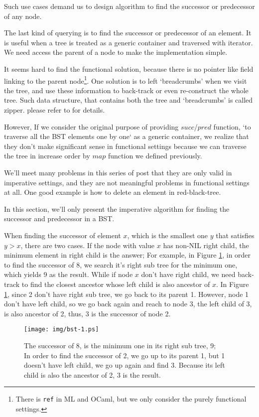 \documentclass[b5paper]{article}
\begin{document}
Such use cases demand us to design algorithm to find the successor or predecessor of any node.

The last kind of querying is to find the successor or predecessor of an element.
It is useful when a tree is treated as a generic container and traversed with
iterator. We need access the parent of a node to make the implementation
simple.

It seems hard to find the functional solution, because there
is no pointer like field linking to the parent node\footnote{There is \texttt{ref} in ML and OCaml, but we only consider the purely functional settings.}. One solution is
to left `breadcrumbs' when we visit the tree, and use these information
to back-track or even re-construct the whole tree. Such data structure,
that contains both the tree and `breadcrumbs' is called zipper.
please refer to \cite{zipper-hbook} for details.

However, If we consider
the original purpose of providing $succ$/$pred$ function, `to traverse all the
BST elements one by one` as a generic container, we realize
that they don't make significant sense in functional settings because
we can traverse the tree in increase order by $map$ function we defined
previously.

We'll meet many problems in this series of post that they are only valid
in imperative settings, and they are not meaningful problems in functional
settings at all. One good example is how to delete an element in
red-black-tree\cite{okasaki-blog}.

In this section, we'll only present the imperative algorithm for finding
the successor and predecessor in a BST.

When finding the successor of element $x$, which is the smallest one $y$
that satisfies $y > x$, there are two cases. If the node with value $x$
has non-NIL right child, the minimum element in right child is the answer;
For example, in Figure \ref{fig:bst-succ}, in order to find the successor
of 8, we search it's right sub tree for the minimum one, which yields 9
as the result. While if node $x$ don't have right child, we need
back-track to find the closest ancestor whose left child is also ancestor
of $x$. In Figure \ref{fig:bst-succ}, since 2 don't have right sub tree,
we go back to its parent 1. However, node 1 don't have left child, so we
go back again and reach to node 3, the left child of 3, is also ancestor
of 2, thus, 3 is the successor of node 2.

\begin{figure}[htbp]
  \centering
  \texttt{[image: img/bst-1.ps]}
  \caption{The successor of 8, is the minimum one in its right sub tree, 9; \\
           In order to find the successor of 2, we go up to its parent 1, but 1 doesn't have left child, we go up again and find 3. Because its left child is also the ancestor of 2, 3 is the result.} \label{fig:bst-succ}
\end{figure}
\end{document}
